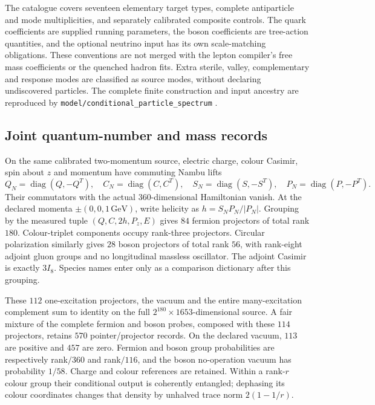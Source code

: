 The catalogue covers seventeen elementary target types, complete
antiparticle and mode multiplicities, and separately calibrated composite
controls. The quark coefficients are supplied running parameters,
the boson coefficients are tree-action quantities, and the optional
neutrino input has its own scale-matching obligations. These conventions
are not merged with the lepton compiler's free mass coefficients or the
quenched hadron fits. Extra sterile, valley, complementary and response
modes are classified as source modes, without declaring undiscovered
particles. The complete finite construction and input ancestry are
reproduced by \texttt{model/conditional\_particle\_spectrum}
\cite{ophrepo}.

\subsection{Joint quantum-number and mass records}

On the same calibrated two-momentum source, electric charge, colour
Casimir, spin about $z$ and momentum have commuting Nambu lifts
\[
 Q_N=\operatorname{diag}(Q,-Q^T),\quad
 C_N=\operatorname{diag}(C,C^T),\quad
 S_N=\operatorname{diag}(S,-S^T),\quad
 P_N=\operatorname{diag}(P,-P^T).
\]
Their commutators with the actual $360$-dimensional Hamiltonian vanish.
At the declared momenta $\pm(0,0,1\,\mathrm{GeV})$, write helicity as
$h=S_NP_N/|P_N|$. Grouping by the measured tuple
$(Q,C,2h,P_z,E)$ gives $84$ fermion projectors of total rank $180$.
Colour-triplet components occupy rank-three projectors. Circular
polarization similarly gives $28$ boson projectors of total rank $56$,
with rank-eight adjoint gluon groups and no longitudinal massless
oscillator. The adjoint Casimir is exactly $3I_8$. Species names enter
only as a comparison dictionary after this grouping.

These $112$ one-excitation projectors, the vacuum and the entire
many-excitation complement sum to identity on the full
$2^{180}\times1653$-dimensional source. A fair mixture of the complete
fermion and boson probes, composed with these $114$ projectors, retains
$570$ pointer/projector records. On the declared vacuum, $113$ are
positive and $457$ are zero. Fermion and boson group probabilities are
respectively rank$/360$ and rank$/116$, and the boson no-operation
vacuum has probability $1/58$. Charge and colour references are
retained. Within a rank-$r$ colour group their conditional output is
coherently entangled; dephasing its colour coordinates changes that
density by unhalved trace norm $2(1-1/r)$.

